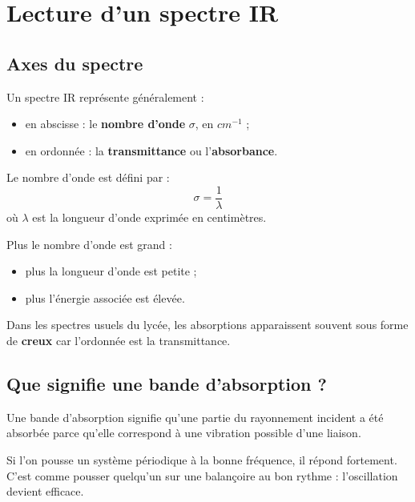 \documentclass[11pt,a4paper]{article}
\begin{document}
\section{Lecture d’un spectre IR}

\subsection{Axes du spectre}

Un spectre IR représente généralement :
\begin{itemize}
    \item en abscisse : le \textbf{nombre d’onde} \(\sigma\), en \(\si{cm^{-1}}\) ;
    \item en ordonnée : la \textbf{transmittance} ou l’\textbf{absorbance}.
\end{itemize}

\begin{definitionbox}
Le nombre d’onde est défini par :
\[
\sigma=\frac{1}{\lambda}
\]
où \(\lambda\) est la longueur d’onde exprimée en centimètres.
\end{definitionbox}

\begin{proprietebox}
Plus le nombre d’onde est grand :
\begin{itemize}
    \item plus la longueur d’onde est petite ;
    \item plus l’énergie associée est élevée.
\end{itemize}
\end{proprietebox}

\begin{comprendrebox}
Dans les spectres usuels du lycée, les absorptions apparaissent souvent sous forme de \textbf{creux} car l’ordonnée est la transmittance.
\end{comprendrebox}

\subsection{Que signifie une bande d’absorption ?}

Une bande d’absorption signifie qu’une partie du rayonnement incident a été absorbée parce qu’elle correspond à une vibration possible d’une liaison.

\begin{analogebox}
Si l’on pousse un système périodique à la bonne fréquence, il répond fortement.  
C’est comme pousser quelqu’un sur une balançoire au bon rythme : l’oscillation devient efficace.
\end{analogebox}
\end{document}
